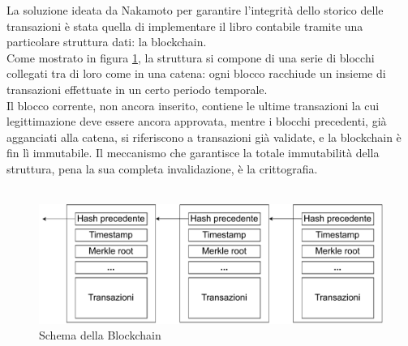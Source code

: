 La soluzione ideata da Nakamoto per garantire l’integrità dello storico delle transazioni è stata quella di implementare il libro contabile tramite una particolare struttura dati: la blockchain.\\Come mostrato in figura \ref{fig:blockchain}, la struttura si compone di una serie di blocchi collegati tra di loro come in una catena: ogni blocco racchiude un insieme di transazioni effettuate in un certo periodo temporale.\\Il blocco corrente, non ancora inserito, contiene le ultime transazioni la cui legittimazione deve essere ancora approvata, mentre i blocchi precedenti, già agganciati alla catena, si riferiscono a transazioni già validate, e la blockchain è fin lì immutabile. Il meccanismo che garantisce la totale immutabilità della struttura, pena la sua completa invalidazione, è la crittografia.\\\\
\begin{figure}[h!]
    \centering
    \includegraphics[scale=0.6]{Images/blockChaining.pdf}
    \caption{Schema della Blockchain}
    \label{fig:blockchain}
\end{figure}
\FloatBarrier
